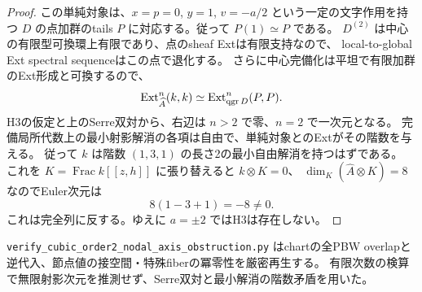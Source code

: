 \begin{proof}
この単純対象は、$x=p=0$, $y=1$, $v=-a/2$ という一定の文字作用を持つ
$D$ の点加群のtails $P$ に対応する。従って $P(1)\simeq P$ である。
$D^{(2)}$ は中心の有限型可換環上有限であり、点のsheaf Extは有限支持なので、
local-to-global Ext spectral sequenceはこの点で退化する。
さらに中心完備化は平坦で有限加群のExt形成と可換するので、
\[
 \operatorname{Ext}^n_{\widehat A}(k,k)\simeq\operatorname{Ext}^n_{\operatorname{qgr} D}(P,P).
\]
H3の仮定と上のSerre双対から、右辺は $n>2$ で零、$n=2$ で一次元となる。
完備局所代数上の最小射影解消の各項は自由で、単純対象とのExtがその階数を与える。
従って $k$ は階数 $(1,3,1)$ の長さ2の最小自由解消を持つはずである。
これを $K=\operatorname{Frac}k[[z,h]]$ に張り替えると $k\otimes K=0$、
$\dim_K(\widehat A\otimes K)=8$ なのでEuler次元は
\[
 8(1-3+1)=-8\ne0.
\]
これは完全列に反する。ゆえに $a=\pm2$ ではH3は存在しない。
\end{proof}
\texttt{verify\_\allowbreak{}cubic\_\allowbreak{}order2\_\allowbreak{}nodal\_\allowbreak{}axis\_\allowbreak{}obstruction.py}
はchartの全PBW overlapと逆代入、節点値の接空間・特殊fiberの冪零性を厳密再生する。
有限次数の検算で無限射影次元を推測せず、Serre双対と最小解消の階数矛盾を用いた。


